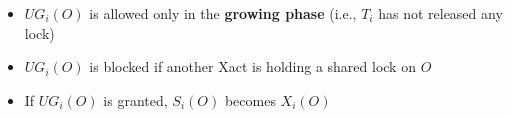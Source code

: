 \documentclass[10pt,landscape]{article}
\newcommand{\1}{\mathmybb{1}}
\begin{document}
\begin{multicols*}{3}
\begin{itemize}
    \item $UG_i(O)$ is allowed only in the \textbf{growing phase} (i.e., $T_i$ has not released any lock)
    \item $UG_i(O)$ is blocked if another Xact is holding a shared lock on $O$
    \item If $UG_i(O)$ is granted, $S_i(O)$ becomes $X_i(O)$

\end{itemize}
\end{multicols*}
\end{document}
